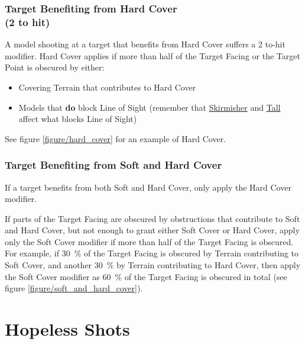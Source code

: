\columnbreak

\subsubsection[Target Benefiting from Hard Cover (\minuss{}2 to hit)]{Target Benefiting from Hard Cover\\ (\minuss{}2 to hit)}

A model shooting at a target that benefits from Hard Cover suffers a \minuss{}2 to-hit modifier. Hard Cover applies if more than half of the Target Facing or the Target Point is obscured by either:
\begin{itemize}
	\item Covering Terrain that contributes to Hard Cover
	\item Models that \textbf{do} block Line of Sight (remember that \hyperref[skirmisher]{Skirmisher} and \hyperref[tall]{Tall} affect what blocks Line of Sight)
\end{itemize}

See figure \ref{figure/hard_cover} for an example of Hard Cover.

\subsubsection[Target Benefiting from Soft and Hard\\ Cover]{Target Benefiting from Soft and Hard Cover}

If a target benefits from both Soft and Hard Cover, only apply the Hard Cover modifier.

If parts of the Target Facing are obscured by obstructions that contribute to Soft and Hard Cover, but not enough to grant either Soft Cover or Hard Cover, apply only the Soft Cover modifier if more than half of the Target Facing is obscured. For example, if \SI{30}{\percent} of the Target Facing is obscured by Terrain contributing to Soft Cover, and another \SI{30}{\percent} by Terrain contributing to Hard Cover, then apply the Soft Cover modifier as \SI{60}{\percent} of the Target Facing is obscured in total (see figure \ref{figure/soft_and_hard_cover}).

\columnbreak

\section{Hopeless Shots}
\label{hopeless_shots}

